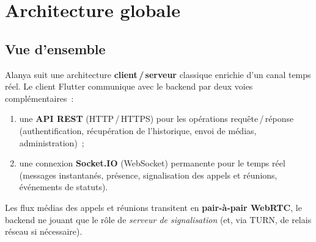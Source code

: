 \documentclass[11pt,a4paper,oneside]{report}
\begin{document}
\chapter{Architecture globale}
\label{chap:archi}

\section{Vue d'ensemble}
Alanya suit une architecture \textbf{client\,/\,serveur} classique enrichie d'un
canal temps r\'{e}el. Le client Flutter communique avec le backend par deux voies
compl\'{e}mentaires~:
\begin{enumerate}[leftmargin=1.4em]
  \item une \textbf{API REST} (HTTP\,/\,HTTPS) pour les op\'{e}rations
        requ\^{e}te\,/\,r\'{e}ponse (authentification, r\'{e}cup\'{e}ration de l'historique,
        envoi de m\'{e}dias, administration)~;
  \item une connexion \textbf{Socket.IO} (WebSocket) permanente pour le temps
        r\'{e}el (messages instantan\'{e}s, pr\'{e}sence, signalisation des appels et
        r\'{e}unions, \'{e}v\'{e}nements de statuts).
\end{enumerate}
Les flux m\'{e}dias des appels et r\'{e}unions transitent en \textbf{pair-\`{a}-pair WebRTC},
le backend ne jouant que le r\^{o}le de \emph{serveur de signalisation}
(et, via TURN, de relais r\'{e}seau si n\'{e}cessaire).

\end{document}
